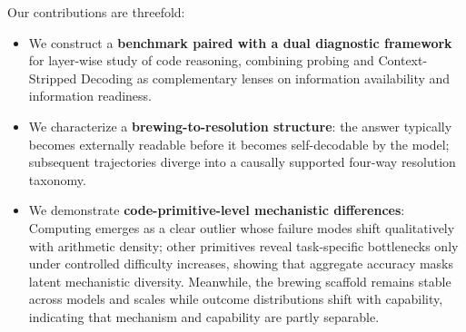 Our contributions are threefold:
\begin{itemize}
    \item We construct a \textbf{benchmark paired with a dual diagnostic framework} for layer-wise study of code reasoning, combining probing and Context-Stripped Decoding as complementary lenses on information availability and information readiness.
    \item We characterize a \textbf{brewing-to-resolution structure}: the answer typically becomes externally readable before it becomes self-decodable by the model; subsequent trajectories diverge into a causally supported four-way resolution taxonomy.
    \item We demonstrate \textbf{code-primitive-level mechanistic differences}: Computing emerges as a clear outlier whose failure modes shift qualitatively with arithmetic density; other primitives reveal task-specific bottlenecks only under controlled difficulty increases, showing that aggregate accuracy masks latent mechanistic diversity. Meanwhile, the brewing scaffold remains stable across models and scales while outcome distributions shift with capability, indicating that mechanism and capability are partly separable.
\end{itemize}
